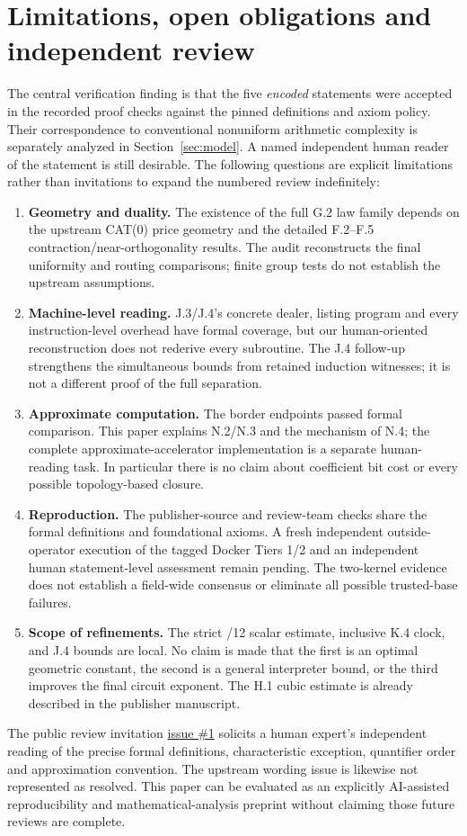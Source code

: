 \documentclass[11pt,letterpaper]{article}
\theoremstyle{definition}\newtheorem{definition}[theorem]{Definition}\newtheorem{example}[theorem]{Example}
\theoremstyle{remark}\newtheorem{remark}[theorem]{Remark}
\begin{document}
\section{Limitations, open obligations and independent review}\label{sec:limits}
The central verification finding is that the five \emph{encoded} statements were accepted in the recorded proof checks against the pinned definitions and axiom policy. Their correspondence to conventional nonuniform arithmetic complexity is separately analyzed in Section~\ref{sec:model}. A named independent human reader of the statement is still desirable. The following questions are explicit limitations rather than invitations to expand the numbered review indefinitely:
\begin{enumerate}[leftmargin=1.7em]
\item \textbf{Geometry and duality.} The existence of the full G.2 law family depends on the upstream CAT(0) price geometry and the detailed F.2--F.5 contraction/near-orthogonality results. The audit reconstructs the final uniformity and routing comparisons; finite group tests do not establish the upstream assumptions.
\item \textbf{Machine-level reading.} J.3/J.4's concrete dealer, listing program and every instruction-level overhead have formal coverage, but our human-oriented reconstruction does not rederive every subroutine. The J.4 follow-up strengthens the simultaneous bounds from retained induction witnesses; it is not a different proof of the full separation.
\item \textbf{Approximate computation.} The border endpoints passed formal comparison. This paper explains N.2/N.3 and the mechanism of N.4; the complete approximate-accelerator implementation is a separate human-reading task. In particular there is no claim about coefficient bit cost or every possible topology-based closure.
\item \textbf{Reproduction.} The publisher-source and review-team checks share the formal definitions and foundational axioms. A fresh independent outside-operator execution of the tagged Docker Tiers 1/2 and an independent human statement-level assessment remain pending. The two-kernel evidence does not establish a field-wide consensus or eliminate all possible trusted-base failures.
\item \textbf{Scope of refinements.} The strict /12 scalar estimate, inclusive K.4 clock, and J.4 bounds are local. No claim is made that the first is an optimal geometric constant, the second is a general interpreter bound, or the third improves the final circuit exponent. The H.1 cubic estimate is already described in the publisher manuscript.
\end{enumerate}
The public review invitation \href{https://github.com/nousentllc/VP-VNP-Review/issues/1}{issue \#1} solicits a human expert's independent reading of the precise formal definitions, characteristic exception, quantifier order and approximation convention. The upstream wording issue is likewise not represented as resolved. This paper can be evaluated as an explicitly AI-assisted reproducibility and mathematical-analysis preprint without claiming those future reviews are complete.
\end{document}
